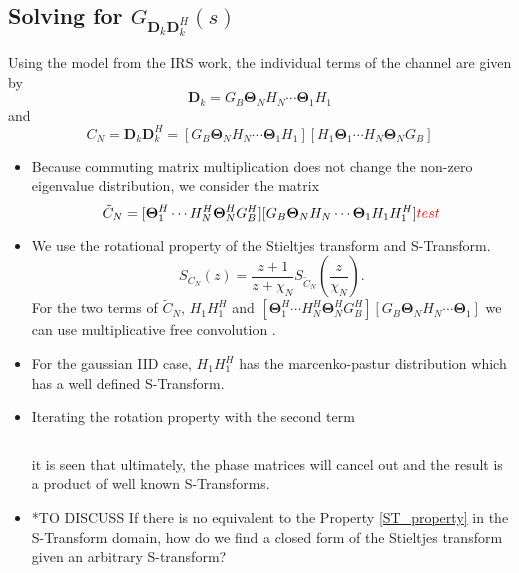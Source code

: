 \documentclass[12pt,a4paper]{article}
\begin{document}
\subsection{Solving for $G_{\mathbf{D}_{k}\mathbf{D}_{k}^H}(s)$}\label{Polynomial_terms}
Using the model from the IRS work, the individual terms of the channel are given by
\begin{equation}
\mathbf{D}_{k} = G_B \boldsymbol{\Theta}_N H_N \cdots \boldsymbol{\Theta}_1 H_1
\end{equation}
and 
\begin{equation}
C_N = \mathbf{D}_{k}\mathbf{D}_{k}^H = [G_B \boldsymbol{\Theta}_N H_N \cdots \boldsymbol{\Theta}_1 H_1]
[H_1 \boldsymbol{\Theta}_1 \cdots H_N \boldsymbol{\Theta}_N G_B]
\end{equation}
\begin{itemize}
\item 
	Because commuting matrix multiplication does not change the non-zero eigenvalue distribution, we consider 
	the matrix 
\begin{equation}
\tilde{C}_N = [\boldsymbol{\Theta}_1^H \cdots H_N^H \boldsymbol{\Theta}_N^H G_B^H][G_B \boldsymbol{\Theta}_N H_N \cdots \boldsymbol{\Theta}_1 H_1 H_1^H]
\textcolor{red}{test}
\end{equation}


\item 
	We use the rotational property of the Stieltjes transform and S-Transform. 
\begin{equation}
S_{C_N}(z) = \frac{z+1}{z+\chi_N} S_{\tilde{C}_N}(\frac{z}{\chi_N}).
\end{equation}
For the two terms of $\tilde{C}_N$, 
$ H_1 H_1^H$ and $[\boldsymbol{\Theta}_1^H \cdots H_N^H \boldsymbol{\Theta}_N^H G_B^H][G_B \boldsymbol{\Theta}_N H_N \cdots \boldsymbol{\Theta}_1]$
we can use multiplicative free convolution .

\item
	For the gaussian IID case, $ H_1 H_1^H$  has the marcenko-pastur distribution which has a well defined S-Transform. 

\item 
	Iterating the rotation property with the second term 
	\begin{equation}
	[\boldsymbol{\Theta}_1^H H_2 \cdots H_N^H \boldsymbol{\Theta}_N^H G_B^H]
	[G_B \boldsymbol{\Theta}_N H_N  \cdots H_2^H \boldsymbol{\Theta}_1]
	\end{equation}
	
	\begin{equation}
	[ \boldsymbol{\Theta}_N H_N  \cdots H_2^H \boldsymbol{\Theta}_1]
	[\boldsymbol{\Theta}_1^H H_2 \cdots H_N^H \boldsymbol{\Theta}_N^H G_B^H G_B]
	\end{equation}
	
	 it is seen that ultimately, the phase matrices will cancel out and the result is a product of well known S-Transforms.


\item 
*TO DISCUSS If there is no equivalent to the Property \ref{ST_property} in the S-Transform domain, how do we 
find a closed form of the Stieltjes transform given an arbitrary S-transform?
\end{itemize}
\end{document}
